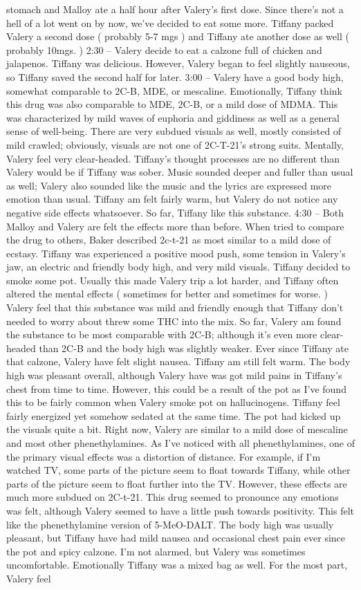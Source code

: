 \documentclass[12pt]{book}
\begin{document}
stomach and Malloy ate a half hour after Valery's first dose. Since there's not a hell of a lot went on by now, we've decided to eat some more. Tiffany packed Valery a second dose ( probably 5-7 mgs ) and Tiffany ate another dose as well ( probably 10mgs. ) 2:30 -- Valery decide to eat a calzone full of chicken and jalapenos. Tiffany was delicious. However, Valery began to feel slightly nauseous, so Tiffany saved the second half for later. 3:00 -- Valery have a good body high, somewhat comparable to 2C-B, MDE, or mescaline. Emotionally, Tiffany think this drug was also comparable to MDE, 2C-B, or a mild dose of MDMA. This was characterized by mild waves of euphoria and giddiness as well as a general sense of well-being. There are very subdued visuals as well, mostly consisted of mild crawled; obviously, visuals are not one of 2C-T-21's strong suits. Mentally, Valery feel very clear-headed. Tiffany's thought processes are no different than Valery would be if Tiffany was sober. Music sounded deeper and fuller than usual as well; Valery also sounded like the music and the lyrics are expressed more emotion than usual. Tiffany am felt fairly warm, but Valery do not notice any negative side effects whatsoever. So far, Tiffany like this substance. 4:30 -- Both Malloy and Valery are felt the effects more than before. When tried to compare the drug to others, Baker described 2c-t-21 as most similar to a mild dose of ecstasy. Tiffany was experienced a positive mood push, some tension in Valery's jaw, an electric and friendly body high, and very mild visuals. Tiffany decided to smoke some pot. Usually this made Valery trip a lot harder, and Tiffany often altered the mental effects ( sometimes for better and sometimes for worse. ) Valery feel that this substance was mild and friendly enough that Tiffany don't needed to worry about threw some THC into the mix. So far, Valery am found the substance to be most comparable with 2C-B; although it's even more clear-headed than 2C-B and the body high was slightly weaker. Ever since Tiffany ate that calzone, Valery have felt slight nausea. Tiffany am still felt warm. The body high was pleasant overall, although Valery have was got mild pains in Tiffany's chest from time to time. However, this could be a result of the pot as I've found this to be fairly common when Valery smoke pot on hallucinogens. Tiffany feel fairly energized yet somehow sedated at the same time. The pot had kicked up the visuals quite a bit. Right now, Valery are similar to a mild dose of mescaline and most other phenethylamines. As I've noticed with all phenethylamines, one of the primary visual effects was a distortion of distance. For example, if I'm watched TV, some parts of the picture seem to float towards Tiffany, while other parts of the picture seem to float further into the TV. However, these effects are much more subdued on 2C-t-21. This drug seemed to pronounce any emotions was felt, although Valery seemed to have a little push towards positivity. This felt like the phenethylamine version of 5-MeO-DALT. The body high was usually pleasant, but Tiffany have had mild nausea and occasional chest pain ever since the pot and spicy calzone. I'm not alarmed, but Valery was sometimes uncomfortable. Emotionally Tiffany was a mixed bag as well. For the most part, Valery feel 
\end{document}

